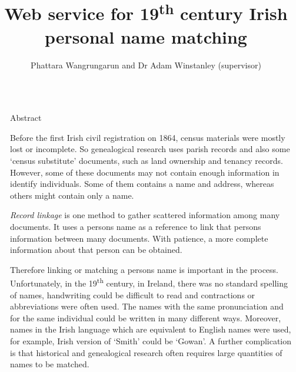 \documentclass[final]{beamer}
\title{Web service for 19\textsuperscript{th} century Irish personal name matching} %
\author{Phattara Wangrungarun and Dr Adam Winstanley (supervisor)} %
\institute{Erasmus Mundus -- MSc in Dependable Software Systems (DESEM) -- Maynooth University -- 2014/15} %
\newlength{\sepwid}
\newlength{\onecolwid}
\begin{document}

\setlength{\belowcaptionskip}{2ex} %
\setlength\belowdisplayshortskip{2ex} %

\begin{frame}[t] %

\begin{columns}[t] %

\begin{column}{\sepwid}\end{column} %

\begin{column}{\onecolwid} %

\begin{block}{Abstract}

Before the first Irish civil registration on 1864, census materials
were mostly lost or incomplete. So genealogical research uses
parish records and also some `census substitute' documents,
such as land ownership and tenancy records. However, some of these documents
may not contain enough information in identify individuals.
Some of them contains a name and address,
whereas others might contain only a name.

\emph{Record linkage} is one method to gather scattered information among many documents.
It uses a person\textquotesingle s name as a reference to link that
person\textquotesingle s information between many documents. With patience,
a more complete information about that person can be obtained.

Therefore linking or matching a person\textquotesingle s name is important in the process.
Unfortunately, in the 19\textsuperscript{th} century, in Ireland, there was no standard
spelling of names, handwriting could be difficult to read
and contractions or abbreviations were often used. The names with the same
pronunciation and for the same individual could be written in many different ways.
Moreover, names in the Irish language which are equivalent to English names
were used, for example, Irish version of `Smith' could be `Gowan'.
A further complication is that historical  and genealogical research often
requires large quantities of names to be matched.


\end{block}
\end{column}
\end{columns}
\end{frame}
\end{document}
